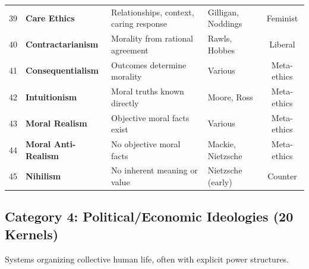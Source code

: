 \documentclass[11pt,a4paper]{article}
\theoremstyle{definition}
\theoremstyle{remark}
\begin{document}
\begin{longtable}{@{}clp{4cm}p{3.5cm}c@{}}
39 & \textbf{Care Ethics} & Relationships, context, caring response & Gilligan, Noddings & Feminist \\
40 & \textbf{Contractarianism} & Morality from rational agreement & Rawls, Hobbes & Liberal \\
41 & \textbf{Consequentialism} & Outcomes determine morality & Various & Meta-ethics \\
42 & \textbf{Intuitionism} & Moral truths known directly & Moore, Ross & Meta-ethics \\
43 & \textbf{Moral Realism} & Objective moral facts exist & Various & Meta-ethics \\
44 & \textbf{Moral Anti-Realism} & No objective moral facts & Mackie, Nietzsche & Meta-ethics \\
45 & \textbf{Nihilism} & No inherent meaning or value & Nietzsche (early) & Counter \\
\end{longtable}

\subsection{Category 4: Political/Economic Ideologies (20 Kernels)}

Systems organizing collective human life, often with explicit power structures.
\end{document}
